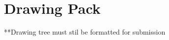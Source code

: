 \chapter{Drawing Pack}
\label{app:drawing_pack}

**Drawing tree must stil be formatted for submission


\clearpage %


